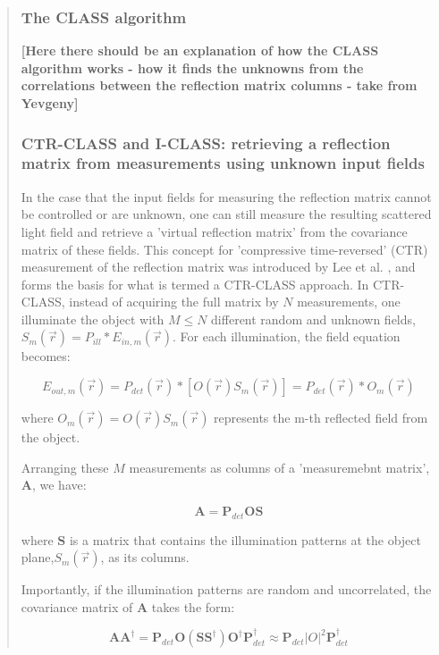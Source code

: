 \documentclass[12pt]{article}
\newenvironment{ourresponse}
    {\begin{tcolorbox}[width=\linewidth,breakable,enhanced,colback=gray!5,colframe=responsecolor!50,title=Response,left=5pt,right=5pt]}
    {\end{tcolorbox}}
\begin{document}
\begin{ourresponse}
\begin{quote}
\subsubsection*{The CLASS algorithm}
\textbf{[Here there should be an explanation of how the CLASS algorithm works - how it finds the unknowns from the correlations between the reflection matrix columns - take from Yevgeny]}
 
\subsubsection*{CTR-CLASS and I-CLASS: retrieving a reflection matrix from measurements using unknown input fields}
In the case that the input fields for measuring the reflection matrix cannot be controlled or are unknown, one can still measure the resulting scattered light field and retrieve a 'virtual reflection matrix' from the covariance matrix of these fields. This concept for 'compressive time-reversed' (CTR) measurement of the reflection matrix was introduced by Lee et al. \cite{lee22}, and forms the basis for what is termed a CTR-CLASS approach.
In CTR-CLASS, instead of acquiring the full matrix by $N$ measurements, one illuminate the object with $M\leq N$ different random and unknown fields, $S_{m}(\vec{r})=P_{ill}*E_{in,m}(\vec{r})$. For each illumination, the field equation becomes:

\begin{equation}
E_{out,m}(\vec{r}) =  P_{det}(\vec{r}) *[O(\vec{r}) S_{m}(\vec{r})] = P_{det}(\vec{r}) * O_m(\vec{r})
\end{equation}

where $O_m(\vec{r}) = O(\vec{r}) S_{m}(\vec{r})$ represents the m-th reflected field from the object.

Arranging these $M$ measurements as columns of a 'measuremebnt matrix', $\mathbf{A}$, we have:

\begin{equation}
\mathbf{A} = \mathbf{P}_{det} \mathbf{O} \mathbf{S}
\end{equation}

where $\mathbf{S} $ is a matrix that contains the illumination patterns at the object plane,$S_{m}(\vec{r})$, as its columns. 

Importantly, if the illumination patterns are random and uncorrelated, the covariance matrix of $\mathbf{A}$ takes the form:

\begin{equation}
\mathbf{A} \mathbf{A}^{\dagger} = \mathbf{P}_{det} \mathbf{O} (\mathbf{S} \mathbf{S}^{\dagger}) \mathbf{O}^{\dagger} \mathbf{P}_{det}^{\dagger} \approx \mathbf{P}_{det} |O|^2 \mathbf{P}_{det}^{\dagger}
\label{eq: cov form}
\end{equation}


\end{quote}
\end{ourresponse}
\end{document}
